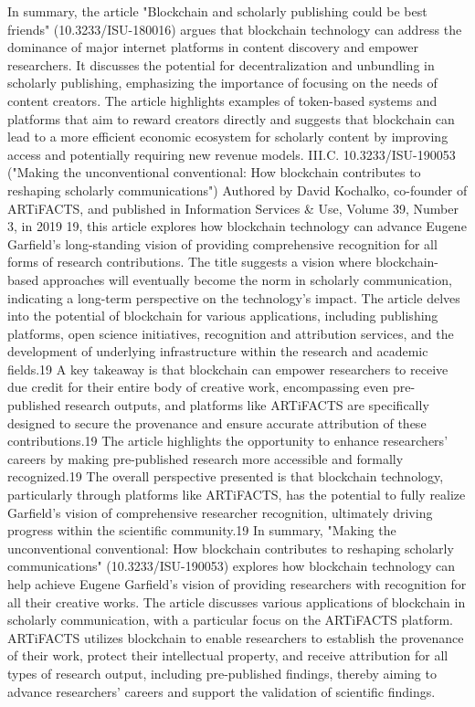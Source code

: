 \documentclass{article}
\begin{document}
In summary, the article "Blockchain and scholarly publishing could be best friends" (10.3233/ISU-180016) argues that blockchain technology can address the dominance of major internet platforms in content discovery and empower researchers. It discusses the potential for decentralization and unbundling in scholarly publishing, emphasizing the importance of focusing on the needs of content creators. The article highlights examples of token-based systems and platforms that aim to reward creators directly and suggests that blockchain can lead to a more efficient economic ecosystem for scholarly content by improving access and potentially requiring new revenue models.
III.C. 10.3233/ISU-190053 ("Making the unconventional conventional: How blockchain contributes to reshaping scholarly communications")
Authored by David Kochalko, co-founder of ARTiFACTS, and published in Information Services & Use, Volume 39, Number 3, in 2019 19, this article explores how blockchain technology can advance Eugene Garfield's long-standing vision of providing comprehensive recognition for all forms of research contributions. The title suggests a vision where blockchain-based approaches will eventually become the norm in scholarly communication, indicating a long-term perspective on the technology's impact. The article delves into the potential of blockchain for various applications, including publishing platforms, open science initiatives, recognition and attribution services, and the development of underlying infrastructure within the research and academic fields.19 A key takeaway is that blockchain can empower researchers to receive due credit for their entire body of creative work, encompassing even pre-published research outputs, and platforms like ARTiFACTS are specifically designed to secure the provenance and ensure accurate attribution of these contributions.19 The article highlights the opportunity to enhance researchers' careers by making pre-published research more accessible and formally recognized.19 The overall perspective presented is that blockchain technology, particularly through platforms like ARTiFACTS, has the potential to fully realize Garfield's vision of comprehensive researcher recognition, ultimately driving progress within the scientific community.19
In summary, "Making the unconventional conventional: How blockchain contributes to reshaping scholarly communications" (10.3233/ISU-190053) explores how blockchain technology can help achieve Eugene Garfield's vision of providing researchers with recognition for all their creative works. The article discusses various applications of blockchain in scholarly communication, with a particular focus on the ARTiFACTS platform. ARTiFACTS utilizes blockchain to enable researchers to establish the provenance of their work, protect their intellectual property, and receive attribution for all types of research output, including pre-published findings, thereby aiming to advance researchers' careers and support the validation of scientific findings.
\end{document}
